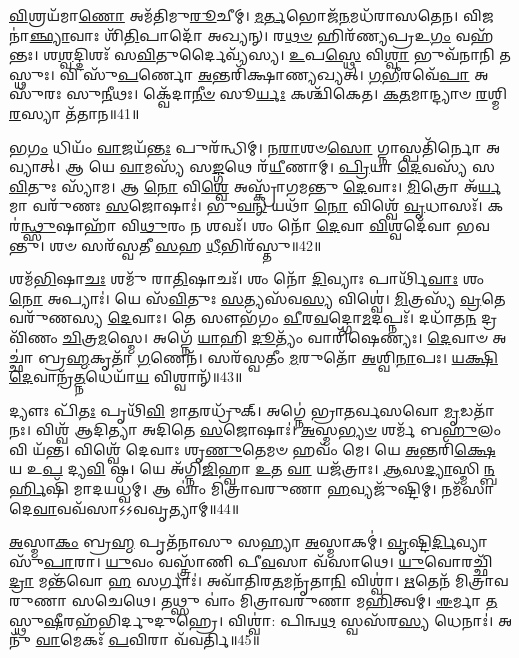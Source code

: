 \-\ul{𑌵𑌿}\-𑌶𑍍𑌰𑌯᳴𑌮𑌾\-\ul{𑌣𑍋} 𑌅𑌮᳴𑌤𑌿𑌮𑍁\-\ul{𑌰𑍂}\-𑌚𑍀𑌮𑍍।
\-\ul{𑌮}\-\-\ul{𑌰𑍍𑌤}\-𑌭𑍋𑌜᳴\-\ul{𑌨}\-𑌮𑌧᳴𑌰𑌾𑌸𑌤𑍇𑌨।
𑌵𑌿𑌜𑌨𑌾॑\-\ul{𑌞𑍍𑌛𑍍𑌯𑌾}\-𑌵𑌾𑌃 𑌶𑌿᳴\-\ul{𑌤𑌿}\-𑌪𑌾𑌦𑍋᳴ 𑌅𑌖𑍍𑌯𑌨𑍍।
𑌰\-\ul{𑌥}\-\-\ul{𑍞} 𑌹𑌿𑌰᳴𑌣𑍍𑌯𑌪𑍍𑌰𑌉\-\ul{𑌗𑌂} 𑌵𑌹᳴𑌨𑍍𑌤𑌃।
𑌶\-\ul{𑌶𑍍𑌵}\-𑌦𑍍𑌦𑌿𑌶𑌃᳴ 𑌸\-\ul{𑌵𑌿}\-𑌤𑍁𑌰𑍍𑌦𑍈𑌵𑍍𑌯᳴𑌸𑍍𑌯।
\-\ul{𑌉}\-𑌪\-\ul{𑌸𑍍𑌥𑍇} 𑌵𑌿\-\ul{𑌶𑍍𑌵𑌾} 𑌭𑍁𑌵᳴𑌨𑌾𑌨𑌿 𑌤𑌸𑍍𑌥𑍁𑌃।
𑌵𑌿 𑌸𑍁᳴\-\ul{𑌪}\-𑌰𑍍𑌣𑍋 \ul{𑌅}\-𑌨𑍍𑌤𑌰𑌿᳴𑌕𑍍𑌷𑌾𑌣𑍍𑌯𑌖𑍍𑌯𑌤𑍍।
\-\ul{𑌗}\-\-\ul{𑌭𑍀}\-𑌰𑌵𑍇᳴\-\ul{𑌪𑌾} 𑌅𑌸𑍁᳴𑌰𑌃 𑌸𑍁\-\ul{𑌨𑍀}\-𑌥𑌃।
𑌕𑍍𑌵𑍇᳴𑌦𑌾\-\ul{𑌨𑍀}\-\-\ul{𑍞} 𑌸𑍂\-\ul{𑌰𑍍𑌯𑌃} 𑌕𑌶𑍍𑌚𑌿᳴𑌕𑍇𑌤।
\-\ul{𑌕}\-\-\ul{𑌤}\-𑌮𑌾𑌨𑍍𑌦𑍍𑌯𑌾𑍞 \ul{𑌰}\-𑌶𑍍𑌮𑌿\-\ul{𑌰}\-𑌸𑍍𑌯𑌾 𑌤᳴𑌤𑌾𑌨॥41॥

𑌭\-\ul{𑌗𑌂} 𑌧𑌿𑌯𑌂᳴ \ul{𑌵𑌾}\-𑌜𑌯᳴\-\ul{𑌨𑍍𑌤𑌃} 𑌪𑍁𑌰᳴𑌨𑍍𑌧𑌿𑌮𑍍।
𑌨\-\ul{𑌰𑌾}\-𑌶𑍞\-\ul{𑌸𑍋} 𑌗𑍍𑌨𑌾𑌸𑍍𑌪𑌤𑌿᳴𑌰𑍍𑌨𑍋 𑌅𑌵𑍍𑌯𑌾𑌤𑍍।
𑌆 𑌯𑍇 \ul{𑌵𑌾}\-𑌮𑌸𑍍𑌯᳴ 𑌸\-\ul{𑌙𑍍𑌗}\-𑌥𑍇 𑌰᳴\-\ul{𑌯𑍀}\-𑌣𑌾𑌮𑍍।
\-\ul{𑌪𑍍𑌰𑌿}\-𑌯𑌾 \ul{𑌦𑍇}\-𑌵𑌸𑍍𑌯᳴ 𑌸\-\ul{𑌵𑌿}\-𑌤𑍁𑌃 𑌸𑍍𑌯𑌾᳴𑌮।
𑌆 \ul{𑌨𑍋} 𑌵𑌿\-\ul{𑌶𑍍𑌵𑍇} 𑌅𑌸𑍍𑌕𑍍𑌰𑌾᳴𑌗𑌮𑌨𑍍𑌤𑍁 \ul{𑌦𑍇}\-𑌵𑌾𑌃।
\-\ul{𑌮𑌿}\-𑌤𑍍𑌰𑍋 𑌅᳴\-\ul{𑌰𑍍𑌯}\-𑌮𑌾 𑌵𑌰𑍁᳴𑌣𑌃 \ul{𑌸}\-𑌜𑍋𑌷𑌾𑌃॑।
𑌭𑍁\-\ul{𑌵}\-\-\ul{𑌨𑍍} 𑌯𑌥𑌾᳴ \ul{𑌨𑍋} 𑌵𑌿𑌶𑍍𑌵𑍇᳴ \ul{𑌵𑍃}\-𑌧𑌾𑌸𑌃᳴।
𑌕𑌰॑\-\ul{𑌨𑍍𑌥𑍍𑌸𑍁}\-𑌷𑌾𑌹𑌾᳴ 𑌵𑌿\-\ul{𑌥𑍁}\-𑌰𑌂 𑌨 𑌶𑌵𑌃᳴।
𑌶𑌂 𑌨𑍋᳴ \ul{𑌦𑍇}\-𑌵𑌾 \ul{𑌵𑌿}\-𑌶𑍍𑌵𑌦𑍇᳴𑌵𑌾 𑌭𑌵𑌨𑍍𑌤𑍁।
𑌶𑍞 𑌸𑌰᳴𑌸𑍍𑌵𑌤𑍀 \ul{𑌸}\-𑌹 \ul{𑌧𑍀}\-𑌭𑌿𑌰᳴𑌸𑍍𑌤𑍁॥42॥

𑌶𑌮᳴\-\ul{𑌭𑌿}\-𑌷𑌾\-\ul{𑌚𑌃} 𑌶𑌮𑍁᳴ 𑌰𑌾\-\ul{𑌤𑌿}\-𑌷𑌾𑌚𑌃᳴।
𑌶𑌂 𑌨𑍋᳴ \ul{𑌦𑌿}\-𑌵𑍍𑌯𑌾𑌃 𑌪𑌾𑌰𑍍𑌥𑌿᳴\-\ul{𑌵𑌾𑌃} 𑌶𑌂 \ul{𑌨𑍋} 𑌅𑌪𑍍𑌯𑌾𑌃॑।
𑌯𑍇 𑌸᳴\-\ul{𑌵𑌿}\-𑌤𑍁𑌃 \ul{𑌸}\-𑌤𑍍𑌯𑌸᳴𑌵\-\ul{𑌸𑍍𑌯} 𑌵𑌿𑌶𑍍𑌵𑍇॑।
\-\ul{𑌮𑌿}\-𑌤𑍍𑌰𑌸𑍍𑌯᳴ \ul{𑌵𑍍𑌰}\-𑌤𑍇 𑌵𑌰𑍁᳴𑌣𑌸𑍍𑌯 \ul{𑌦𑍇}\-𑌵𑌾𑌃।
𑌤𑍇 𑌸𑍗𑌭᳴𑌗𑌂 \ul{𑌵𑍀}\-𑌰\-\ul{𑌵}\-𑌦𑍍𑌗𑍋\-\ul{𑌮}\-𑌦𑌪𑍍𑌨𑌃᳴।
𑌦𑌧𑌾᳴𑌤\-\ul{𑌨} 𑌦𑍍𑌰𑌵𑌿᳴𑌣𑌂 \ul{𑌚𑌿}\-𑌤𑍍𑌰\-\ul{𑌮}\-𑌸𑍍𑌮𑍇।
𑌅𑌗𑍍𑌨𑍇᳴ \ul{𑌯𑌾}\-𑌹𑌿 \ul{𑌦𑍂}\-𑌤𑍍𑌯𑌂᳴ 𑌵𑌾𑌰𑌿᳴𑌷𑍇𑌣𑍍𑌯𑌃।
\-\ul{𑌦𑍇}\-𑌵𑌾𑍞 𑌅𑌚𑍍𑌛𑌾॑ 𑌬𑍍𑌰\-\ul{𑌹𑍍𑌮}\-𑌕𑍃𑌤𑌾᳴ \ul{𑌗}\-𑌣𑍇𑌨᳴।
𑌸𑌰᳴𑌸𑍍𑌵𑌤𑍀𑌂 \ul{𑌮}\-𑌰𑍁𑌤𑍋᳴ \ul{𑌅}\-𑌶𑍍𑌵𑌿\-\ul{𑌨𑌾}\-𑌪𑌃।
\-\ul{𑌯}\-\-\ul{𑌕𑍍𑌷𑌿} \ul{𑌦𑍇}\-𑌵𑌾𑌨𑍍𑌰᳴\-\ul{𑌤𑍍𑌨}\-𑌧𑍇𑌯𑌾᳴\-\ul{𑌯} 𑌵𑌿𑌶𑍍𑌵𑌾𑌨𑍍᳴॥43॥

𑌦𑍍𑌯𑍗𑌃 𑌪𑌿᳴\-\ul{𑌤𑌃} 𑌪𑍃𑌥𑌿᳴\-\ul{𑌵𑌿} 𑌮𑌾\-\ul{𑌤}\-𑌰𑌧𑍍𑌰𑍁᳴𑌕𑍍।
𑌅𑌗𑍍𑌨𑍇॑ 𑌭𑍍𑌰𑌾𑌤𑌰𑍍𑌵𑌸𑌵𑍋 \ul{𑌮𑍃}\-𑌡𑌤𑌾᳴ 𑌨𑌃।
𑌵𑌿𑌶𑍍𑌵᳴ 𑌆𑌦𑌿𑌤𑍍𑌯𑌾 𑌅𑌦𑌿𑌤𑍇 \ul{𑌸}\-𑌜𑍋𑌷𑌾𑌃॑।
\-\ul{𑌅}\-𑌸𑍍𑌮\-\ul{𑌭𑍍𑌯}\-\-\ul{𑍞} 𑌶𑌰𑍍𑌮᳴ 𑌬\-\ul{𑌹𑍁}\-𑌲𑌂 𑌵𑌿 𑌯᳴𑌨𑍍𑌤।
𑌵𑌿𑌶𑍍𑌵𑍇᳴ 𑌦𑍇𑌵𑌾𑌃 𑌶𑍃\-\ul{𑌣𑍁}\-𑌤𑍇𑌮𑍞 𑌹𑌵𑌂᳴ 𑌮𑍇।
𑌯𑍇 \ul{𑌅}\-𑌨𑍍𑌤𑌰𑌿᳴\-\ul{𑌕𑍍𑌷𑍇} 𑌯 𑌉\-\ul{𑌪} 𑌦𑍍𑌯\-\ul{𑌵𑌿} 𑌷𑍍𑌠।
𑌯𑍇 𑌅᳴𑌗𑍍𑌨𑌿\-\ul{𑌜𑌿}\-𑌹𑍍𑌵𑌾 \ul{𑌉}\-𑌤 \ul{𑌵𑌾} 𑌯𑌜᳴𑌤𑍍𑌰𑌾𑌃।
\-\ul{𑌆}\-𑌸\-\ul{𑌦𑍍𑌯𑌾}\-𑌸𑍍𑌮𑌿\-\ul{𑌨𑍍𑌬}\-\-\ul{𑌰𑍍}\-𑌹𑌿𑌷𑌿᳴ 𑌮𑌾𑌦𑌯𑌧𑍍𑌵𑌮𑍍।
𑌆 𑌵𑌾𑌂॑ 𑌮𑌿𑌤𑍍𑌰𑌾𑌵𑌰𑍁𑌣𑌾 \ul{𑌹}\-𑌵𑍍𑌯𑌜𑍁᳴𑌷𑍍𑌟𑌿𑌮𑍍।
𑌨𑌮᳴𑌸𑌾 𑌦𑍇\-\ul{𑌵𑌾}\-𑌵𑌵᳴𑌸𑌾𑌽𑌽𑌵𑌵𑍃𑌤𑍍𑌯𑌾𑌮𑍍॥44॥

\-\ul{𑌅}\-𑌸𑍍𑌮𑌾\-\ul{𑌕𑌂} 𑌬𑍍𑌰\-\ul{𑌹𑍍𑌮} 𑌪𑍃𑌤᳴𑌨𑌾𑌸𑍁 𑌸𑌹𑍍𑌯𑌾 \ul{𑌅}\-𑌸𑍍𑌮𑌾𑌕𑌮𑍍॑।
\-\ul{𑌵𑍃}\-𑌷𑍍𑌟𑌿\-\ul{𑌰𑍍𑌦𑌿}\-𑌵𑍍𑌯𑌾 𑌸𑍁᳴\-\ul{𑌪𑌾}\-𑌰𑌾।
\-\ul{𑌯𑍁}\-𑌵𑌂 𑌵𑌸𑍍𑌤𑍍𑌰𑌾᳴𑌣𑌿 𑌪𑍀\-\ul{𑌵}\-𑌸𑌾 𑌵᳴𑌸𑌾𑌥𑍇।
\-\ul{𑌯𑍁}\-𑌵𑍋𑌰𑌚𑍍𑌛𑌿᳴\-\ul{𑌦𑍍𑌰𑌾} 𑌮𑌨𑍍𑌤᳴𑌵𑍋 \ul{𑌹} 𑌸𑌰𑍍𑌗𑌾𑌃॑।
𑌅𑌵𑌾᳴𑌤𑌿𑌰\-\ul{𑌤}\-𑌮𑌨𑍃᳴𑌤𑌾\-\ul{𑌨𑌿} 𑌵𑌿𑌶𑍍𑌵𑌾॑।
\-\ul{𑌋}\-𑌤𑍇𑌨᳴ 𑌮𑌿𑌤𑍍𑌰𑌾𑌵𑌰𑍁𑌣𑌾 𑌸𑌚𑍇𑌥𑍇।
𑌤𑌥𑍍𑌸𑍁 𑌵𑌾𑌂॑ 𑌮𑌿𑌤𑍍𑌰𑌾𑌵𑌰𑍁𑌣𑌾 𑌮\-\ul{𑌹𑌿}\-𑌤𑍍𑌵𑌮𑍍।
\-\ul{𑌈}\-𑌰𑍍𑌮𑌾 \ul{𑌤}\-𑌸𑍍𑌥𑍁\-\ul{𑌷𑍀}\-𑌰𑌹᳴𑌭𑌿𑌰𑍍𑌦𑍁𑌦𑍁𑌹𑍍𑌰𑍇।
𑌵𑌿𑌶𑍍𑌵𑌾॑: 𑌪𑌿𑌨𑍍𑌵\-\ul{𑌥} 𑌸𑍍𑌵𑌸᳴𑌰\-\ul{𑌸𑍍𑌯} 𑌧𑍇𑌨𑌾𑌃॑।
𑌅𑌨𑍁᳴ \ul{𑌵𑌾}\-𑌮𑍇𑌕𑌃᳴ \ul{𑌪}\-𑌵𑌿𑌰𑌾 𑌵᳴𑌵𑌰𑍍𑌤𑌿॥45॥


